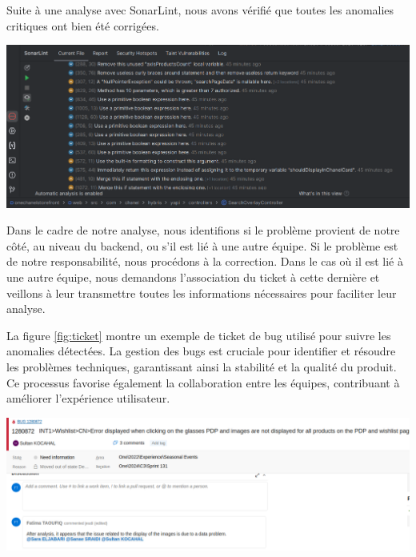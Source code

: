 Suite à une analyse avec SonarLint, nous avons vérifié que toutes les anomalies critiques ont bien été corrigées.

\begin{center}
    \centering
    \includegraphics[width=19cm]{Figures/bug1.png}
\end{center}


Dans le cadre de notre analyse, nous identifions si le problème provient de notre côté, au niveau du backend, ou s'il est lié à une autre équipe. Si le problème est de notre responsabilité, nous procédons à la correction. Dans le cas où il est lié à une autre équipe, nous demandons l'association du ticket à cette dernière et veillons à leur transmettre toutes les informations nécessaires pour faciliter leur analyse.

 La figure  \ref{fig:ticket}  montre un exemple de ticket de bug utilisé pour suivre les anomalies détectées. La gestion des bugs est cruciale pour identifier et résoudre les problèmes techniques, garantissant ainsi la stabilité et la qualité du produit. Ce processus favorise également la collaboration entre les équipes, contribuant à améliorer l'expérience utilisateur.
\begin{center}
    \centering
    \includegraphics[width=19cm]{Figures/Screens/ticket.png}
    \label{fig:ticket}
\end{center}




